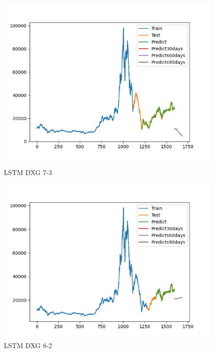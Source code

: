 \documentclass[conference]{IEEEtran}
\begin{document}
\begin{figure}[htbp]
    \begin{minipage}{0.23\textwidth}
    \centering
    \includegraphics[width=1\textwidth]{experiment/ltsm/Team4_LSTM_DIG_7_3.png}
    \caption{LSTM DXG 7-3}
    \label{fig:nvl_boxplot}
    \end{minipage}
    \hfill
    \begin{minipage}{0.23\textwidth}
    \centering
    \includegraphics[width=1\textwidth]{experiment/ltsm/Team4_LSTM_DIG_8_2.png}
    \caption{LSTM DXG 8-2}
    \label{fig:nvl_histogram}
    \end{minipage}
    \begin{minipage}{0.23\textwidth}
    \centering

\end{minipage}
\end{figure}
\end{document}

